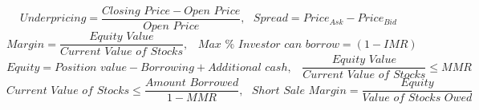 $$Underpricing = \frac{Closing \,\, Price - Open \,\, Price}{Open \,\, Price}, \,\,\,\, Spread = Price_{Ask} - Price_{Bid}$$
$$Margin = \frac{Equity \,\, Value}{Current \,\, Value \,\, of \,\, Stocks}, \,\,\,\,\, Max \,\, \% \,\, Investor \,\, can \,\, borrow = (1-IMR)$$
$$Equity = Position \,\, value - Borrowing + Additional \,\, cash, \,\,\,\,\, \frac{Equity \,\, Value}{Current \,\, Value \,\, of \,\, Stocks} \leq MMR$$
$$Current \,\, Value \,\, of \,\, Stocks \leq \frac{Amount \,\, Borrowed}{1-MMR}, \,\,\,\, Short \,\, Sale \,\, Margin = \frac{Equity}{Value \,\, of \,\, Stocks \,\, Owed}$$